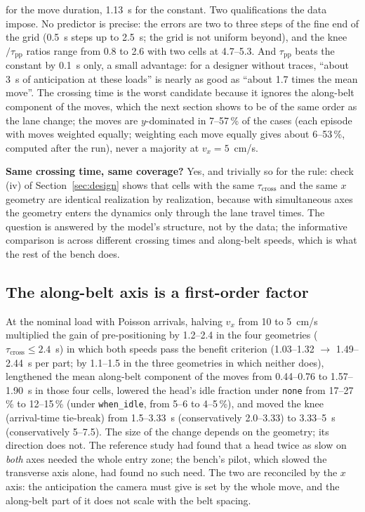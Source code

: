 \documentclass[11pt,a4paper]{article}
\newcommand{\tcross}{\tau_{\mathrm{cross}}}
\newcommand{\tpp}{\tau_{\mathrm{pp}}}
\begin{document}
for the move duration, 1.13~s for the constant. Two qualifications the data impose. No predictor
is precise: the errors are two to three steps of the fine end of the grid (0.5~s steps up to 2.5~s; the grid is not uniform beyond), and the knee$/\tpp$
ratios range from 0.8 to 2.6 with two cells at 4.7--5.3. And $\tpp$ beats the constant by
0.1~s only, a small advantage: for a designer without traces, ``about 3~s of anticipation
at these loads'' is nearly as good as ``about 1.7 times the mean move''. The crossing time is the worst candidate because it ignores
the along-belt component of the moves, which the next section shows to be of the same
order as the lane change; the moves are $y$-dominated in 7--57\,\% of the cases (each
episode with moves weighted equally; weighting each move equally gives about
6--53\,\%, computed after the run), never a majority at $v_x=5$~cm/s.

\textbf{Same crossing time, same coverage?} Yes, and trivially so for the rule: check (iv)
of Section~\ref{sec:design} shows that cells with the same $\tcross$ and the same $x$
geometry are identical realization by realization, because with simultaneous axes the
geometry enters the dynamics only through the lane travel times. The question is
answered by the model's structure, not by the data; the informative comparison is across
different crossing times and along-belt speeds, which is what the rest of the bench does.

\subsection{The along-belt axis is a first-order factor}\label{sec:vx}
At the nominal load with Poisson arrivals, halving $v_x$ from 10 to 5~cm/s multiplied
the gain of pre-positioning by 1.2--2.4 in the four geometries ($\tcross\le2.4$~s) in
which both speeds pass the benefit criterion (1.03--1.32 $\to$ 1.49--2.44~s per part; by
1.1--1.5 in the three geometries in which neither does), lengthened the mean along-belt
component of the moves from 0.44--0.76 to 1.57--1.90~s in those four cells, lowered the
head's idle fraction under \texttt{none} from 17--27\,\% to 12--15\,\% (under
\texttt{when\_idle}, from 5--6 to 4--5\,\%), and moved the knee (arrival-time tie-break) from 1.5--3.33~s
(conservatively 2.0--3.33) to 3.33--5~s (conservatively 5--7.5). The size of the change
depends on the geometry; its direction does not.
The reference study had found that a head twice as slow on \emph{both} axes needed the
whole entry zone; the bench's pilot, which slowed the transverse axis alone, had found no
such need. The two are reconciled by the $x$ axis: the anticipation the camera must give
is set by the whole move, and the along-belt part of it does not scale with the belt
spacing.
\end{document}
